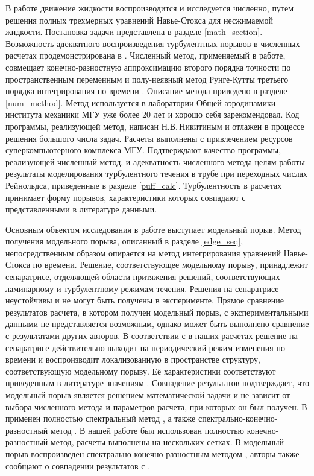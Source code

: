 В работе движение жидкости воспроизводится и исследуется численно, путем решения полных трехмерных уравнений Навье-Стокса для несжимаемой жидкости. Постановка задачи представлена в разделе \ref{math_section}. Возможность адекватного воспроизведения турбулентных порывов в численных расчетах продемонстрирована в \cite{Priymak2004}. Численный метод, применяемый в работе, совмещает конечно-разностную аппроксимацию второго порядка точности по пространственным переменным и полу-неявный метод Рунге-Кутты третьего порядка интегрирования по времени \cite{Nikitin2006, Nikitin2006third}. Описание метода приведено в разделе \ref{num_method}. Метод используется в лаборатории Общей аэродинамики института механики МГУ уже более 20 лет и хорошо себя зарекомендовал. Код программы, реализующей метод, написан Н.В.\,Никитиным и отлажен в процессе решения большого числа задач. Расчеты выполнены с привлечением ресурсов суперкомпьютерного комплекса МГУ. Подтверждают качество программы, реализующей численный метод, и адекватность численного метода целям работы результаты моделирования турбулентного течения в трубе при переходных числах Рейнольдса, приведенные в разделе \ref{puff_calc}. Турбулентность в расчетах принимает форму порывов, характеристики которых совпадают с представленными в литературе данными. 

Основным объектом исследования в работе выступает модельный порыв. Метод получения модельного порыва, описанный в разделе \ref{edge_seq}, непосредственным образом опирается на метод интегрирования уравнений Навье-Сток\-са по времени. Решение, соответствующее модельному порыву, принадлежит сепаратрисе, отделяющей области притяжения решений, соответствующих ламинарному и турбулентному режимам течения. Решения на сепаратрисе неустойчивы и не могут быть получены в эксперименте. Прямое сравнение результатов расчета, в котором получен модельный порыв, с экспериментальными данными не представляется возможным, однако может быть выполнено сравнение с результатами других авторов. В соответствии с \cite{Avila2013} в наших расчетах решение на сепаратрисе действительно выходит на периодический режим изменения по времени и воспроизводит локализованную в пространстве структуру, соответствующую модельному порыву. Её характеристики соответствуют приведенным в литературе значениям \cite{Avila2013, Chantry2014}. Совпадение результатов подтверждает, что модельный порыв является решением математической задачи и не зависит от выбора численного метода и параметров расчета, при которых он был получен. В \cite{Avila2013} применен полностью спектральный метод \cite{Meseguer2007}, а также спектрально-конечно-разностный метод \cite{Willis2009}. В нашей работе был использован полностью конечно-разностный метод, расчеты выполнены на нескольких сетках. В \cite{Chantry2014} модельный порыв воспроизведен спектрально-конечно-разностным методом \cite{Willis2009}, авторы также сообщают о совпадении результатов с \cite{Avila2013}. 

